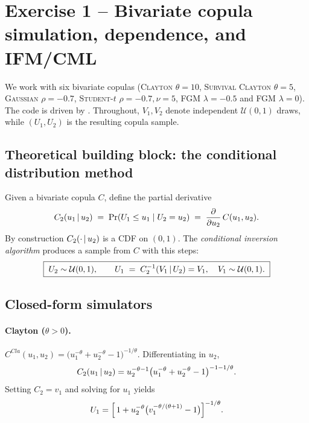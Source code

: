 \section{Exercise 1 -- Bivariate copula simulation, dependence, and IFM/CML}
\label{sec:ex1}

We work with six bivariate copulas (\textsc{Clayton} $\theta=10$, \textsc{Survival
Clayton} $\theta=5$, \textsc{Gaussian} $\rho=-0.7$, \textsc{Student-$t$}
$\rho=-0.7,\nu=5$, \textsc{FGM} $\lambda=-0.5$ and \textsc{FGM} $\lambda=0$).
The code is driven by
. Throughout, $V_1,V_2$ denote independent
$\mathcal{U}(0,1)$ draws, while $(U_1,U_2)$
is the resulting copula sample.

\subsection{Theoretical building block: the conditional distribution method}

Given a bivariate copula $C$, define the partial derivative
\[
C_2(u_1\,|\, u_2)\;=\;\Pr(U_1\le u_1\mid U_2=u_2)\;=\;\frac{\partial}{\partial u_2}\,C(u_1,u_2).
\]
By construction $C_2(\cdot\,|\, u_2)$ is a CDF on $(0,1)$. The
\emph{conditional inversion algorithm} produces a sample from $C$ with this steps:
\[
\boxed{\;U_2\sim\mathcal{U}(0,1),\qquad U_1\;=\;C_2^{-1}(V_1\,|\, U_2)=V_1,\quad V_1\sim\mathcal{U}(0,1).\;}
\]

\subsection{Closed-form simulators}

\paragraph{Clayton ($\theta>0$).}
$C^{Cla}(u_1,u_2)=\bigl(u_1^{-\theta}+u_2^{-\theta}-1\bigr)^{-1/\theta}$.
Differentiating in $u_2$,
\[
C_2(u_1\,|\, u_2)=u_2^{-\theta-1}\bigl(u_1^{-\theta}+u_2^{-\theta}-1\bigr)^{-1-1/\theta}.
\]
Setting $C_2=v_1$ and solving for $u_1$ yields
\begin{equation}\label{eq:clayton-sim}
U_1=\Bigl[\,1+u_2^{-\theta}\bigl(v_1^{-\theta/(\theta+1)}-1\bigr)\Bigr]^{-1/\theta}.
\end{equation}

